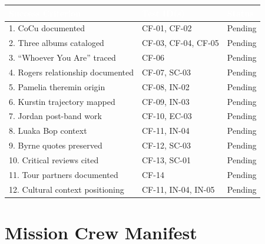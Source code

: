 \documentclass[11pt,letterpaper]{article}
\newcommand{\tableheader}[1]{\textbf{\sffamily\textcolor{white}{#1}}}
\begin{document}
\begin{center}
\begin{tabularx}{\textwidth}{XL{3cm}C{1.5cm}}
\toprule
{}
\tableheader{Success Criterion} & \tableheader{Test ID(s)} & \tableheader{Status} \\
. CoCu documented & CF-01, CF-02 & Pending \\
2. Three albums cataloged & CF-03, CF-04, CF-05 & Pending \\
3. ``Whoever You Are'' traced & CF-06 & Pending \\
4. Rogers relationship documented & CF-07, SC-03 & Pending \\
5. Pamelia theremin origin & CF-08, IN-02 & Pending \\
6. Kurstin trajectory mapped & CF-09, IN-03 & Pending \\
7. Jordan post-band work & CF-10, EC-03 & Pending \\
8. Luaka Bop context & CF-11, IN-04 & Pending \\
9. Byrne quotes preserved & CF-12, SC-03 & Pending \\
10. Critical reviews cited & CF-13, SC-01 & Pending \\
11. Tour partners documented & CF-14 & Pending \\
12. Cultural context positioning & CF-11, IN-04, IN-05 & Pending \\
\bottomrule
\end{tabularx}
\end{center}

\section{Mission Crew Manifest}
\end{document}
